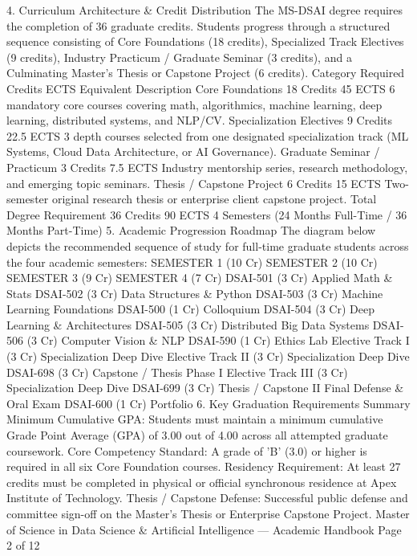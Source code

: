 4. Curriculum Architecture \& Credit Distribution
The MS-DSAI degree requires the completion of 36 graduate credits. Students progress through a structured
sequence consisting of Core Foundations (18 credits), Specialized Track Electives (9 credits), Industry Practicum /
Graduate Seminar (3 credits), and a Culminating Master's Thesis or Capstone Project (6 credits).
Category
Required
Credits
ECTS
Equivalent
Description
Core Foundations
18 Credits
45 ECTS
6 mandatory core courses covering math, algorithmics, machine
learning, deep learning, distributed systems, and NLP/CV.
Specialization
Electives
9 Credits
22.5 ECTS
3 depth courses selected from one designated specialization track
(ML Systems, Cloud Data Architecture, or AI Governance).
Graduate Seminar /
Practicum
3 Credits
7.5 ECTS
Industry mentorship series, research methodology, and emerging
topic seminars.
Thesis / Capstone
Project
6 Credits
15 ECTS
Two-semester original research thesis or enterprise client capstone
project.
Total Degree
Requirement
36 Credits
90 ECTS
4 Semesters (24 Months Full-Time / 36 Months Part-Time)
5. Academic Progression Roadmap
The diagram below depicts the recommended sequence of study for full-time graduate students across the four
academic semesters:
SEMESTER 1 (10 Cr)
SEMESTER 2 (10 Cr)
SEMESTER 3 (9 Cr)
SEMESTER 4 (7 Cr)
DSAI-501 (3 Cr)
Applied Math \& Stats
DSAI-502 (3 Cr)
Data Structures \& Python
DSAI-503 (3 Cr)
Machine Learning Foundations
DSAI-500 (1 Cr) Colloquium
DSAI-504 (3 Cr)
Deep Learning \& Architectures
DSAI-505 (3 Cr)
Distributed Big Data Systems
DSAI-506 (3 Cr)
Computer Vision \& NLP
DSAI-590 (1 Cr) Ethics Lab
Elective Track I (3 Cr)
Specialization Deep Dive
Elective Track II (3 Cr)
Specialization Deep Dive
DSAI-698 (3 Cr)
Capstone / Thesis Phase I
Elective Track III (3 Cr)
Specialization Deep Dive
DSAI-699 (3 Cr)
Thesis / Capstone II
Final Defense \& Oral Exam
DSAI-600 (1 Cr) Portfolio
6. Key Graduation Requirements Summary
Minimum Cumulative GPA: Students must maintain a minimum cumulative Grade Point Average (GPA) of 3.00 out of
4.00 across all attempted graduate coursework.
Core Competency Standard: A grade of 'B' (3.0) or higher is required in all six Core Foundation courses.
Residency Requirement: At least 27 credits must be completed in physical or official synchronous residence at Apex
Institute of Technology.
Thesis / Capstone Defense: Successful public defense and committee sign-off on the Master's Thesis or Enterprise
Capstone Project.
Master of Science in Data Science \& Artificial Intelligence — Academic Handbook
Page 2 of 12

